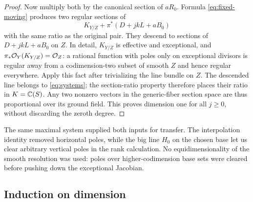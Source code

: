 \begin{proof}
Now multiply both by the canonical section of $aR_0$. Formula
\eqref{eq:fixed-moving} produces two regular sections of
\[
                   K_{Y/Z}+\pi^*(D+jkL+aB_0)
\]
with the same ratio as the original pair. They descend to sections
of $D+jkL+aB_0$ on $Z$. In detail, $K_{Y/Z}$ is effective and
exceptional, and $\pi_*\mathcal O_Y(K_{Y/Z})=\mathcal O_Z$: a rational function
with poles only on exceptional divisors is regular away from a
codimension-two subset of smooth $Z$ and hence regular everywhere.
Apply this fact after trivializing the line bundle on $Z$.
The descended line belongs to \eqref{eq:systems}; the section-ratio
property therefore places their ratio in $K=\mathbb C(S)$.
Any two nonzero vectors in the generic-fiber section space are thus
proportional over its ground field. This proves dimension one for
all $j\ge0$, without discarding the zeroth degree.
\end{proof}

The same maximal system supplied both inputs for transfer. The
interpolation identity removed horizontal poles, while the big line
$H_0$ on the chosen base let us clear arbitrary vertical poles in
the rank calculation. No equidimensionality of the smooth resolution
was used: poles over higher-codimension base sets were cleared before
pushing down the exceptional Jacobian.

\subsection{Induction on dimension}


